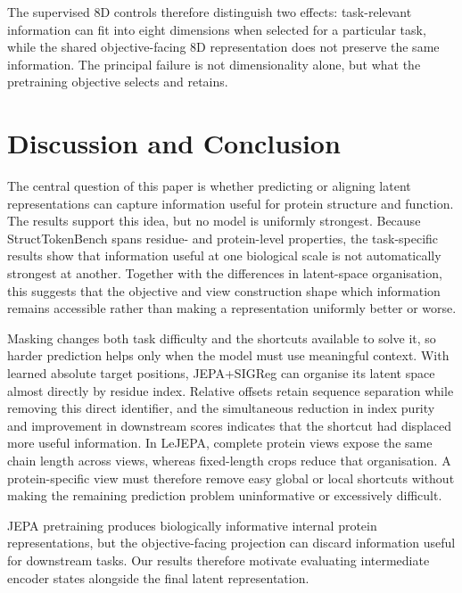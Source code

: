 \documentclass{article}
\newcommand{\aigen}[1]{\textcolor{green!50!black}{#1}}
\begin{document}
\aigen{The supervised 8D controls therefore distinguish two effects: task-relevant information can fit into eight dimensions when selected for a particular task, while the shared objective-facing 8D representation does not preserve the same information. The principal failure is not dimensionality alone, but what the pretraining objective selects and retains.}

\section{Discussion and Conclusion}

The central question of this \aigen{paper} is whether predicting or aligning latent representations can capture information useful for protein structure and function. The results support this idea, but no model is uniformly strongest. Because StructTokenBench spans residue- and protein-level properties, the task-specific results show that information useful at one biological scale is not automatically strongest at another. Together with the differences in latent-space organisation, this suggests that the objective and view construction shape which information remains accessible rather than making a representation uniformly better or worse.

Masking changes both task difficulty and the shortcuts available to solve it, so harder prediction helps only when the model must use meaningful context. With learned absolute target positions, JEPA+SIGReg can organise its latent space almost directly by residue index. Relative offsets retain sequence separation while removing this direct identifier, and the simultaneous reduction in index purity and improvement in downstream scores indicates that the shortcut had displaced more useful information. In LeJEPA, complete protein views expose the same chain length across views, whereas fixed-length crops reduce that organisation. A protein-specific view must therefore remove easy global or local shortcuts without making the remaining prediction problem uninformative or excessively difficult.

\aigen{JEPA pretraining produces biologically informative internal protein representations, but the objective-facing projection can discard information useful for downstream tasks. Our results therefore motivate evaluating intermediate encoder states alongside the final latent representation.}
\end{document}
